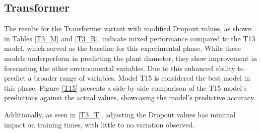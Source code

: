 \subsection{Transformer}
The results for the Transformer variant with modified Dropout values, as shown in Tables \ref{T3_M} and \ref{T3_R}, indicate mixed performance compared to the T13 model, which served as the baseline for this experimental phase. While these models underperform in predicting the plant diameter, they show improvement in forecasting the other environmental variables. Due to this enhanced ability to predict a broader range of variables, Model T15 is considered the best model in this phase. Figure \ref{T15} presents a side-by-side comparison of the T15 model's predictions against the actual values, showcasing the model's predictive accuracy.

Additionally, as seen in \ref{T3_T}, adjusting the Dropout values has minimal impact on training times, with little to no variation observed.


\begin{table}[]
    \centering
    \caption{Mean Squared Errors (MSE) for different Transformer models obtained by varying the Dropout, sorted by model}
    \label{T3_M}
    \end{table}


